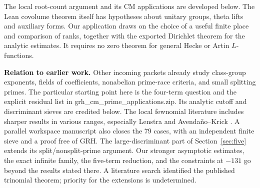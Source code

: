\documentclass[11pt,letterpaper]{article}
\newcommand{\src}[1]{\textsf{\small #1}}\newcommand{\divider}{\par\noindent\textcolor{blue}{\rule{\linewidth}{.8pt}}\par}
\newcommand{\heading}[1]{\textbf{\color{ink}#1}}
\begin{document}
The local root-count argument and its CM applications are developed below. The Lean covolume theorem itself has hypotheses about unitary groups, theta lifts and auxiliary forms. Our application draws on the choice of a useful finite place and comparison of ranks, together with the exported Dirichlet theorem for the analytic estimates. It requires no zero theorem for general Hecke or Artin $L$-functions.

\heading{Relation to earlier work.} Other incoming packets already study class-group exponents, fields of coefficients, nonabelian prime-race criteria, and small splitting primes. The particular starting point here is the four-term question and the explicit residual list in \src{grh\_cm\_prime\_applications.zip}. Its analytic cutoff and discriminant sieves are credited below. The local fewnomial literature includes sharper results in various ranges, especially Lenstra and Avenda\~no--Krick \cite{few}. A parallel workspace manuscript \cite{parallel} also closes the 79 cases, with an independent finite sieve and a proof free of GRH. The large-discriminant part of Section~\ref{sec:five} extends its split/nonsplit-prime argument. Our stronger asymptotic estimates, the exact infinite family, the five-term reduction, and the constraints at $-131$ go beyond the results stated there. A literature search identified the published trinomial theorem; priority for the extensions is undetermined.
\clearpage
\end{document}
